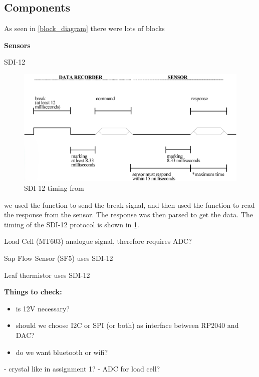 \subsection{Components}



As seen in \cref{block_diagram} there were lots of blocks


\textbf{Sensors}

SDI-12

\begin{figure}
    \includegraphics[width=\linewidth]{figures/SDI-12_timing.png}
    \caption{SDI-12 timing from \cite{sdi12_datasheet}}
    \label{sdi12_timing}
\end{figure}

we used the  function to send the break signal, and then used the  function to read the response from the sensor. The response was then parsed to get the data. The timing of the SDI-12 protocol is shown in \cref{sdi12_timing}.

Load Cell (MT603)
analogue signal, therefore requires ADC?

Sap Flow Sensor (SF5)
uses SDI-12

Leaf thermistor
uses SDI-12

\textbf{Things to check:}
\begin{itemize}
    \item is 12V necessary?
    \item should we choose I2C or SPI (or both) as interface between RP2040 and DAC?
    \item do we want bluetooth or wifi?
\end{itemize}
- crystal like in assignment 1?
- ADC for load cell?